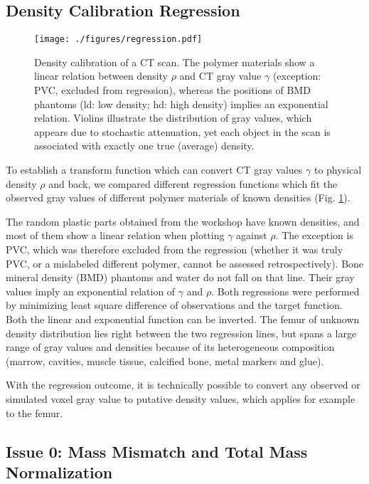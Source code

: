 \subsection{Density Calibration Regression}
\label{sec:org880496a}
\begin{figure}[htbp]
\centering
\texttt{[image: ./figures/regression.pdf]}
\caption{\label{fig:density_calibration}Density calibration of a CT scan. The polymer materials show a linear relation between density \(\rho\) and CT gray value \(\gamma\) (exception: PVC, excluded from regression), whereas the positions of BMD phantoms (ld: low density; hd: high density) implies an exponential relation. Violins illustrate the distribution of gray values, which appears due to stochastic attenuation, yet each object in the scan is associated with exactly one true (average) density.}
\end{figure}

To establish a transform function which can convert CT gray values \(\gamma\) to physical density \(\rho\) and back, we compared different regression functions which fit the observed gray values of different polymer materials of known densities (Fig. \ref{fig:density_calibration}).

The random plastic parts obtained from the workshop have known densities, and most of them show a linear relation when plotting \(\gamma\) against \(\rho\).
The exception is PVC, which was therefore excluded from the regression (whether it was truly PVC, or a mislabeled different polymer, cannot be assessed retrospectively).
Bone mineral density (BMD) phantoms and water do not fall on that line.
Their gray values imply an exponential relation of \(\gamma\) and \(\rho\).
Both regressions were performed by minimizing least square difference of observations and the target function.
Both the linear and exponential function can be inverted.
The femur of unknown density distribution lies right between the two regression lines, but spans a large range of gray values and densities because of its heterogeneous composition (marrow, cavities, muscle tissue, calcified bone, metal markers and glue).

With the regression outcome, it is technically possible to convert any observed or simulated voxel gray value to putative density values, which applies for example to the femur.


\subsection{Issue 0: Mass Mismatch and Total Mass Normalization}
\label{sec:org183d29d}

